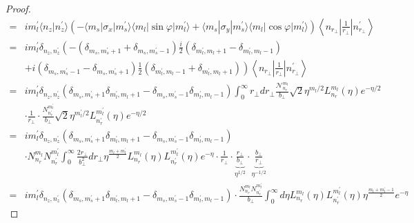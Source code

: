 \begin{proof}
\begin{equation}
\begin{aligned}
        =& i m_l^\prime \langle n_z | n_z^{\prime} \rangle \left( -\langle m_s | \sigma_x | m_s^{\prime} \rangle \langle m_l | \sin\varphi | m_l^{\prime} \rangle + \langle m_s | \sigma_y | m_s^{\prime} \rangle \langle m_l | \cos\varphi | m_l^{\prime}\rangle\right) \left\langle n_{r_{\perp}} \left| \frac{1}{r_{\perp}} \right| n_{r_\perp}^{\prime} \right\rangle \\
        =& i m_l^\prime \delta_{n_z,n_z^\prime} \left( -\left( \delta_{m_s,m_s^{\prime}+1} + \delta_{m_s,m_s^{\prime}-1} \right) \frac{i}{2} \left(\delta _{m_{l}^{\prime},m_{l}+1} - \delta_{m_{l}^{\prime},m_{l}-1}\right) \right. \\
        & \left. + i\left(\delta_{m_s,m_s^{\prime}-1} - \delta_{m_s,m_s^{\prime}+1}\right) \frac{1}{2}\left(\delta_{m_{l}^{\prime},m_{l}-1}+\delta_{m_{l}^{\prime},m_{l}+1}\right) \right) \left\langle n_{r_{\perp}} \left| \frac{1}{r_{\perp}} \right| n_{r_\perp}^{\prime} \right\rangle \\
        =& i m_l^\prime \delta_{n_z,n_z^\prime} \left(\delta_{m_s,m_s^{\prime}+1} \delta_{m_{l}^{\prime},m_{l}+1} - \delta_{m_s,m_s^{\prime}-1} \delta_{m_{l}^{\prime},m_{l}-1} \right) \int_{0}^{\infty} r_{\perp} dr_{\perp} \frac{ \mathcal{N}_{n_r}^{m_l} }{ b_{\perp} } \sqrt{2} \eta^{m_l/2} L_{n_r}^{m_l}(\eta) e^{-\eta/2} \\
        &\cdot \frac{1}{r_{\perp}} \cdot \frac{ N_{n_r^{\prime}}^{m_l^{\prime}} }{ b_{\perp} } \sqrt{2} \eta^{m_l^{\prime}/2} L_{n_r^{\prime}}^{m_l^{\prime}}(\eta) e^{-\eta/2} \\
        =& i m_l^\prime \delta_{n_z,n_z^\prime} \left(\delta_{m_s,m_s^{\prime}+1} \delta_{m_{l}^{\prime},m_{l}+1} - \delta_{m_s,m_s^{\prime}-1} \delta_{m_{l}^{\prime},m_{l}-1} \right) \\
        & \cdot N_{n_r}^{m_l} N_{n_r^{\prime}}^{m_l^{\prime}}\int_{0}^{\infty} \frac{2r_{\perp}}{b_{\perp}^2} dr_{\perp} \eta^{\frac{m_l + m_l^\prime}{2}} L_{n_r}^{m_l}(\eta) L_{n_r^\prime}^{m_l^\prime}(\eta)e^{-\eta} \cdot \frac{1}{r_\perp} \cdot  \underbrace{\frac{r_\perp}{b_\perp}}_{\eta^{1/2}} \cdot \underbrace{\frac{b_\perp}{r_\perp}}_{\eta^{-1/2}}\\
        =& i m_l^\prime \delta_{n_z,n_z^\prime} \left(\delta_{m_s,m_s^{\prime}+1} \delta_{m_{l}^{\prime},m_{l}+1} - \delta_{m_s,m_s^{\prime}-1} \delta_{m_{l}^{\prime},m_{l}-1} \right) \cdot \frac{N_{n_r}^{m_l} N_{n_r^{\prime}}^{m_l^{\prime}}}{b_{\perp}} \int_{0}^{\infty} d\eta L_{n_r}^{m_l}(\eta) L_{n_r^\prime}^{m_l^\prime}(\eta) \eta^{\frac{m_l + m_l^\prime - 1}{2}} e^{-\eta}
      \end{aligned}
    \end{equation}


\end{proof}
